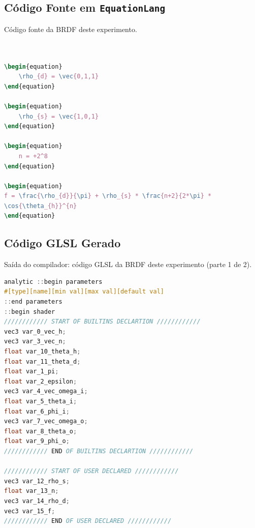 \subsection{Código Fonte em \texttt{EquationLang}}
\begin{codigo}[H]
    \caption{\small Código fonte da BRDF deste experimento.}
    \label{cod-blinn-phong-eqlang}
\begin{lstlisting}[language=tex, frame=none, inputencoding=utf8]


\begin{equation}
    \rho_{d} = \vec{0,1,1}
\end{equation}

\begin{equation}
    \rho_{s} = \vec{1,0,1}
\end{equation}

\begin{equation}
    n = +2^8
\end{equation}

\begin{equation}
f = \frac{\rho_{d}}{\pi} + \rho_{s} * \frac{n+2}{2*\pi} *
\cos{\theta_{h}}^{n}
\end{equation}
\end{lstlisting}
\end{codigo}

\subsection{Código GLSL Gerado}
\begin{codigo}[H]
    \caption{\small Saída do compilador: código GLSL da BRDF deste experimento (parte 1 de 2).}
    \label{cod-blinn-phong-glsl-pt-1}
\begin{lstlisting}[language=C, inputencoding=utf8]
analytic ::begin parameters
#[type][name][min val][max val][default val]
::end parameters
::begin shader
//////////// START OF BUILTINS DECLARTION ////////////
vec3 var_0_vec_h;
vec3 var_3_vec_n;
float var_10_theta_h;
float var_11_theta_d;
float var_1_pi;
float var_2_epsilon;
vec3 var_4_vec_omega_i;
float var_5_theta_i;
float var_6_phi_i;
vec3 var_7_vec_omega_o;
float var_8_theta_o;
float var_9_phi_o;
//////////// END OF BUILTINS DECLARTION ////////////

//////////// START OF USER DECLARED ////////////
vec3 var_12_rho_s;
float var_13_n;
vec3 var_14_rho_d;
vec3 var_15_f;
//////////// END OF USER DECLARED ////////////
\end{lstlisting}
\end{codigo}

